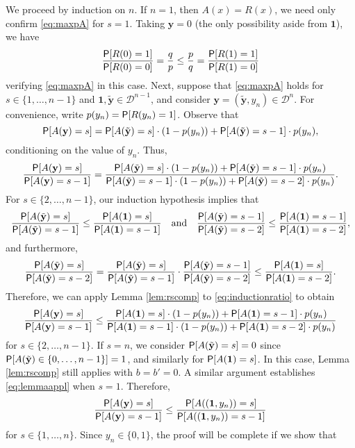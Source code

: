 \documentclass[11pt,draft]{article}
\newcommand{\Dsp}{\mathcal{D}}
\newcommand{\yv}{\mathbf{y}}
\newcommand{\yvt}{\tilde{\yv}}
\newcommand{\one}{\boldsymbol{1}}
\begin{document}
\begin{pf}
We proceed by induction on $n$. If $n = 1$, then $A(x) = R(x)$, we need only confirm \eqref{eq:maxpA} for $s = 1$.
Taking $\yv = 0$ (the only possibility aside from $\one$), we have
\begin{equation} \label{eq:singleratio}
\frac{\P[R(0) = 1]}{\P[R(0) = 0]} = \frac{q}{p} \leq
\frac{p}{q} = \frac{\P[R(1) = 1]}{\P[R(1) = 0]}
\end{equation}
verifying \eqref{eq:maxpA} in this case.
Next, suppose that \eqref{eq:maxpA} holds for $s\in\{1,\dots,n-1\}$ and $\one,\yvt \in \Dsp^{n-1}$, and consider $\yv = (\yvt, y_n) \in \Dsp^n$.
For convenience, write $p(y_n) = \P[R(y_n) = 1]$. 
Observe that
\[ \P[A(\yv) = s] = \P[A(\yvt) = s]\cdot(1-p(y_n)) +
\P[A(\yvt) = s-1]\cdot p(y_n), \]
conditioning on the value of $y_n$.
Thus,
\begin{equation} \label{eq:inductionratio}
\frac{\P[A(\yv) = s]}{\P[A(\yv) = s-1]}
= \frac{\P[A(\yvt) = s]\cdot(1-p(y_n)) +
\P[A(\yvt) = s-1]\cdot p(y_n)}
{\P[A(\yvt) = s-1]\cdot(1-p(y_n)) +
\P[A(\yvt) = s-2]\cdot p(y_n)}.
\end{equation}
For $s \in \{2,\dots,n-1\}$, our induction hypothesis implies that
\[
\frac{\P[A(\yvt) = s]}{\P[A(\yvt) = s-1]} \leq
\frac{\P[A(\one) = s]}{\P[A(\one) = s-1]}\quad\text{and}\quad
\frac{\P[A(\yvt) = s-1]}{\P[A(\yvt) = s-2]} \leq
\frac{\P[A(\one) = s-1]}{\P[A(\one) = s-2]},
\]
and furthermore,
\[ \frac{\P[A(\yvt) = s]}{\P[A(\yvt) = s-2]} =
\frac{\P[A(\yvt) = s]}{\P[A(\yvt) = s-1]}\cdot
\frac{\P[A(\yvt) = s-1]}{\P[A(\yvt) = s-2]} \leq
\frac{\P[A(\one) = s]}{\P[A(\one) = s-2]}.
\]
Therefore, we can apply Lemma \ref{lem:rscomp} to \eqref{eq:inductionratio} to obtain
\begin{equation} \label{eq:lemmaappl}
\frac{\P[A(\yv) = s]}{\P[A(\yv) = s-1]} \leq
\frac{\P[A(\one) = s]\cdot(1-p(y_n)) +
\P[A(\one) = s-1]\cdot p(y_n)}
{\P[A(\one) = s-1]\cdot(1-p(y_n)) +
\P[A(\one) = s-2]\cdot p(y_n)}
\end{equation}
for $s \in \{2,\dots,n-1\}$.
If $s = n$, we consider $\P[A(\yvt) = s] = 0$ since
$\P[A(\yvt) \in \{0,\dots,n-1\}] = 1$, and similarly for $\P[A(\one) = s]$.
In this case, Lemma \ref{lem:rscomp} still applies with $b=b'=0$.
A similar argument establishes \eqref{eq:lemmaappl} when $s = 1$.
Therefore,
\[
\frac{\P[A(\yv) = s]}{\P[A(\yv) = s-1]} \leq
\frac{\P[A((\one,y_n)) = s]}{\P[A((\one,y_n)) = s-1]}
\]
for $s \in \{1,\dots,n\}$.
Since $y_n\in\{0,1\}$, the proof will be complete if we show that

\end{pf}
\end{document}

